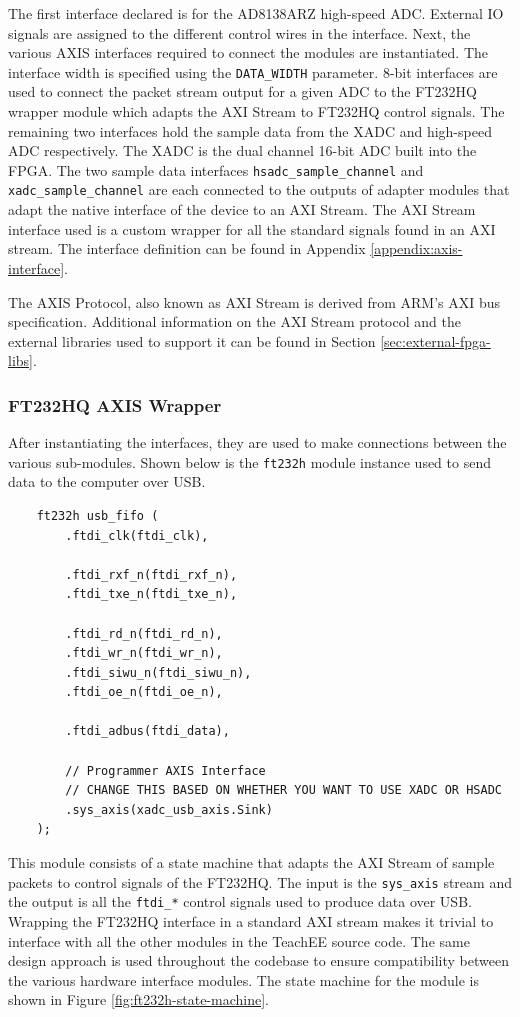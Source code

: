 \documentclass[letterpaper,11pt]{article}
\newcommand{\code}[1]{\texttt{#1}}
\begin{document}
The first interface declared is for the AD8138ARZ high-speed ADC. External IO
signals are assigned to the different control wires in the interface. Next, the
various AXIS interfaces required to connect the modules are instantiated. The
interface width is specified using the \code{DATA_WIDTH} parameter. 8-bit
interfaces are used to connect the packet stream output for a given ADC to the
FT232HQ wrapper module which adapts the AXI Stream to FT232HQ control signals.
The remaining two interfaces hold the sample data from the XADC and high-speed
ADC respectively. The XADC is the dual channel 16-bit ADC built into the FPGA.
The two sample data interfaces \code{hsadc_sample_channel} and
\code{xadc_sample_channel} are each connected to the outputs of adapter modules
that adapt the native interface of the device to an AXI Stream. The AXI Stream
interface used is a custom wrapper for all the standard signals found in an AXI
stream. The interface definition can be found in Appendix
\ref{appendix:axis-interface}.

The AXIS Protocol, also known as AXI Stream is derived from ARM's AXI bus
specification. Additional information on the AXI Stream protocol and the
external libraries used to support it can be found in Section
\ref{sec:external-fpga-libs}.

\subsubsection{FT232HQ AXIS Wrapper}
After instantiating the interfaces, they are used to make connections between
the various sub-modules. Shown below is the \code{ft232h} module instance used
to send data to the computer over USB.

\begin{verbatim}
    ft232h usb_fifo (
        .ftdi_clk(ftdi_clk),

        .ftdi_rxf_n(ftdi_rxf_n),
        .ftdi_txe_n(ftdi_txe_n),

        .ftdi_rd_n(ftdi_rd_n),
        .ftdi_wr_n(ftdi_wr_n),
        .ftdi_siwu_n(ftdi_siwu_n),
        .ftdi_oe_n(ftdi_oe_n),

        .ftdi_adbus(ftdi_data),

        // Programmer AXIS Interface
        // CHANGE THIS BASED ON WHETHER YOU WANT TO USE XADC OR HSADC
        .sys_axis(xadc_usb_axis.Sink)
    );
\end{verbatim}

This module consists of a state machine that adapts the AXI Stream of sample
packets to control signals of the FT232HQ. The input is the \code{sys_axis}
stream and the output is all the \code{ftdi_*} control signals used to produce
data over USB. Wrapping the FT232HQ interface in a standard AXI stream makes it
trivial to interface with all the other modules in the TeachEE source code. The
same design approach is used throughout the codebase to ensure compatibility
between the various hardware interface modules. The state machine for the module
is shown in Figure \ref{fig:ft232h-state-machine}.
\end{document}
